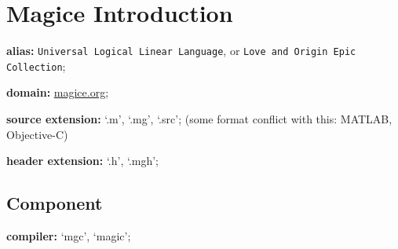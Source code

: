 \documentclass[UTF8]{book}
\begin{document}
	\author{dosconio}
	\section{Magice Introduction}
	
	\textbf{alias:} \texttt{Universal Logical Linear Language}, or
		\texttt{Love and Origin Epic Collection};
	
	\textbf{domain:} \href{http://magice.org}{magice.org};
	
	\textbf{source extension:} `.m', `.mg', `.src'; (some format conflict with this: MATLAB, Objective-C)
	
	\textbf{header extension:} `.h', `.mgh';
	
		\subsection{Component}
		
		\textbf{compiler:} `mgc', `magic';
	
\end{document}
